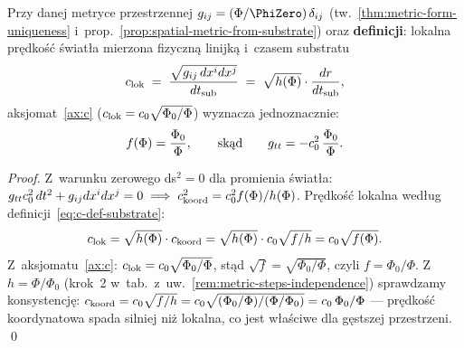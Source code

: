 \begin{proposition}%
\label{prop:g00-from-axioms}
Przy danej metryce przestrzennej $g_{ij} = (\Phi/\PhiZero)\,\delta_{ij}$
(tw.~\ref{thm:metric-form-uniqueness} i~prop.~\ref{prop:spatial-metric-from-substrate})
oraz \textbf{definicji}: lokalna pr\k{e}dko\'s\'c \'swiat\l{}a mierzona
fizyczn\k{a} linijk\k{a} i~czasem substratu
\begin{equation}\label{eq:c-def-substrate}
  c_{\rm lok} \;=\; \frac{\sqrt{g_{ij}\,dx^i dx^j}}{dt_{\rm sub}}
  \;=\; \sqrt{h(\Phi)}\cdot \frac{dr}{dt_{\rm sub}},
\end{equation}
aksjomat~\ref{ax:c} ($c_{\rm lok} = c_0\sqrt{\Phi_0/\Phi}$) wyznacza jednoznacznie:
\begin{equation}\label{eq:f-from-axiom}
  f(\Phi) = \frac{\Phi_0}{\Phi},
  \qquad\text{sk\k{a}d}\qquad
  g_{tt} = -c_0^2\,\frac{\Phi_0}{\Phi}.
\end{equation}
\end{proposition}

\begin{proof}
Z~warunku zerowego ds$^2 = 0$ dla promienia \'swiat\l{}a:
$g_{tt}c_0^2\,dt^2 + g_{ij}dx^i dx^j = 0
\;\Longrightarrow\;
c_{\rm koord}^2 = c_0^2 f(\Phi)/h(\Phi)$.
Pr\k{e}dko\'s\'c lokalna wed\l{}ug definicji~\eqref{eq:c-def-substrate}:
\[
  c_{\rm lok}
  = \sqrt{h(\Phi)}\cdot c_{\rm koord}
  = \sqrt{h(\Phi)}\cdot c_0\sqrt{f/h}
  = c_0\sqrt{f(\Phi)}.
\]
Z~aksjomatu~\ref{ax:c}: $c_{\rm lok} = c_0\sqrt{\Phi_0/\Phi}$, st\k{a}d
$\sqrt{f} = \sqrt{\Phi_0/\Phi}$, czyli $f = \Phi_0/\Phi$.
Z~$h = \Phi/\Phi_0$ (krok~2 w~tab.~z~uw.~\ref{rem:metric-steps-independence})
sprawdzamy konsystencj\k{e}:
$c_{\rm koord} = c_0\sqrt{f/h} = c_0\sqrt{(\Phi_0/\Phi)/(\Phi/\Phi_0)}
= c_0\,\Phi_0/\Phi$ --- pr\k{e}dko\'s\'c koordynatowa spada silniej
ni\.z lokalna, co jest w\l{}a\'sciwe dla g\k{e}stszej przestrzeni. \qed
\end{proof}

